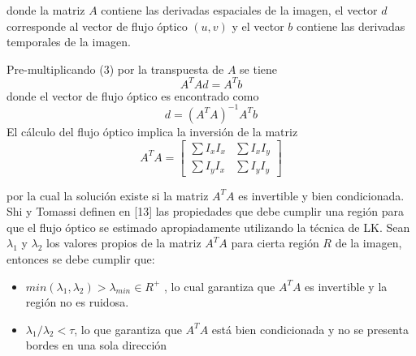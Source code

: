 donde la matriz $A$ contiene las derivadas espaciales de la imagen, el vector $d$ corresponde al vector de flujo óptico $(u,v)$ y el vector $b$ contiene las derivadas temporales de la imagen.

Pre-multiplicando (3) por la transpuesta de $A$ se tiene
\begin{equation}
  A^T A d =A^T b
\end{equation}
donde el vector de flujo óptico es encontrado como 
\begin{equation}
  d= (A^T A)^{-1} A^T b
\end{equation}
El cálculo del flujo óptico implica la inversión de la matriz 
\begin{equation}
  A^TA=
  \begin{bmatrix}
    \sum I_x I_x  & \sum I_x I_y \\
    \sum I_y I_x  & \sum I_y I_y      
  \end{bmatrix}
\end{equation}

por la cual la solución existe si la matriz $A^TA$ es invertible y bien condicionada. Shi y Tomassi definen en [13] las propiedades que debe cumplir una región para que el flujo óptico se estimado apropiadamente utilizando la técnica de LK. Sean $\lambda_1$ y $\lambda_2$ los valores propios de la matriz  $A^TA$ para cierta región $R$ de la imagen, entonces se debe cumplir que:
\begin{itemize}
\item $min(\lambda_1 , \lambda_2) > \lambda_{min} \in R^+$ , lo cual garantiza que $A^TA$ es invertible y la región no es ruidosa.
\item $\lambda_1 /\lambda_2 < \tau$, lo que garantiza que $A^TA$ está bien condicionada y no se presenta bordes en una sola dirección
\end{itemize}

